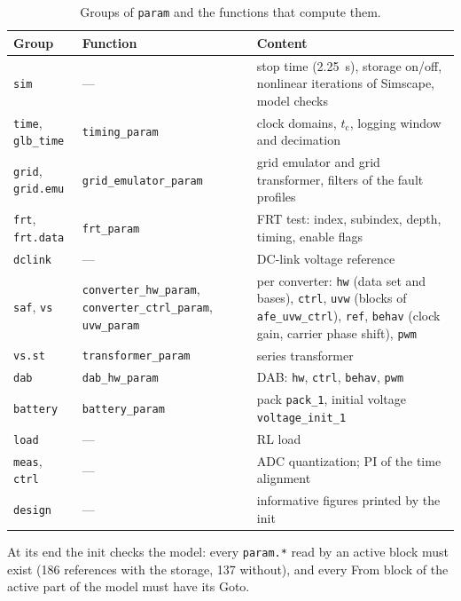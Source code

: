 \documentclass[11pt,a4paper]{scrartcl}
\newcommand{\ped}[1]{_{\mathrm{#1}}}
\newcommand{\code}[1]{\texttt{#1}}
\begin{document}
\begin{onehalfspace}
\begin{table}[H]
	\centering
	\captionsetup{width=0.9\textwidth, font=small}
	\caption{Groups of \code{param} and the functions that compute them.}
	\label{tab:param}
	\footnotesize
	\begin{tabularx}{0.97\textwidth}{@{} >{\raggedright\arraybackslash}p{} >{\raggedright\arraybackslash}p{} X @{}}
		\toprule
		\textbf{Group} & \textbf{Function} & \textbf{Content} \\
		\midrule
		\code{sim} & --- & stop time (\SI{2.25}{s}), storage on/off, nonlinear iterations of Simscape, model checks \\
		\code{time}, \code{glb\_time} & \code{timing\_param} & clock domains, $t\ped{c}$, logging window and decimation \\
		\code{grid}, \code{grid.emu} & \code{grid\_emulator\_param} & grid emulator and grid transformer, filters of the fault profiles \\
		\code{frt}, \code{frt.data} & \code{frt\_param} & FRT test: index, subindex, depth, timing, enable flags \\
		\code{dclink} & --- & DC-link voltage reference \\
		\code{saf}, \code{vs} & \code{converter\_hw\_param}, \code{converter\_ctrl\_param}, \code{uvw\_param} & per converter: \code{hw} (data set and bases), \code{ctrl}, \code{uvw} (blocks of \code{afe\_uvw\_ctrl}), \code{ref}, \code{behav} (clock gain, carrier phase shift), \code{pwm} \\
		\code{vs.st} & \code{transformer\_param} & series transformer \\
		\code{dab} & \code{dab\_hw\_param} & DAB: \code{hw}, \code{ctrl}, \code{behav}, \code{pwm} \\
		\code{battery} & \code{battery\_param} & pack \code{pack\_1}, initial voltage \code{voltage\_init\_1} \\
		\code{load} & --- & RL load \\
		\code{meas}, \code{ctrl} & --- & ADC quantization; PI of the time alignment \\
		\code{design} & --- & informative figures printed by the init \\
		\bottomrule
	\end{tabularx}
\end{table}

At its end the init checks the model: every \code{param.*} read by an active block must exist (186 references with the storage, 137 without), and every From block of the active part of the model must have its Goto.


\end{onehalfspace}
\end{document}
